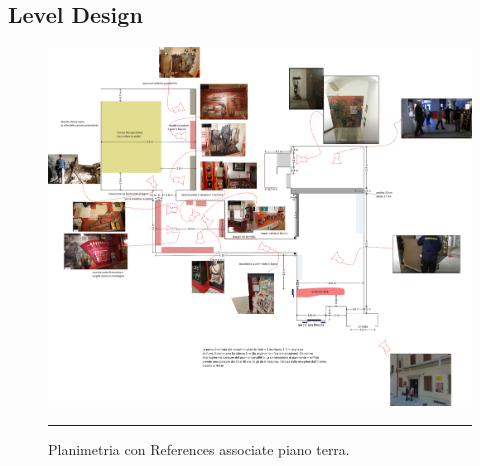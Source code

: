 \documentclass[10pt, openany]{article}
\begin{document}
  \subsection{Level Design}\label{vr:planimetria}
  \begin{figure}[h]
    \centering
    \begin{mdframed}[
      linecolor=black,
      linewidth=1pt,
      innertopmargin=6pt,
      innerbottommargin=6pt,
      innerleftmargin=6pt,
      innerrightmargin=6pt
    ]
    \includegraphics[width=\linewidth]{museo_planimetria_piano_terra.png}
    \vspace{3pt}
    \hrule
    \vspace{6pt}
    \caption{Planimetria con References associate piano terra.}
    \end{mdframed}
  \end{figure}
\end{document}
